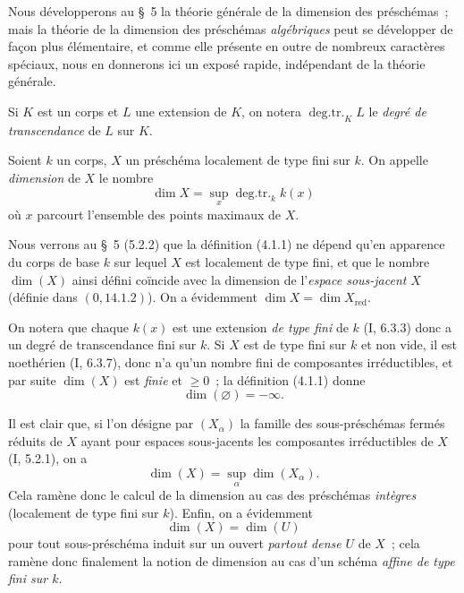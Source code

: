 Nous développerons au \S~5 la théorie générale de la dimension des préschémas~;
mais la théorie de la dimension des préschémas \emph{algébriques} peut se
développer de façon plus élémentaire, et comme elle présente en outre de
nombreux caractères spéciaux, nous en donnerons ici un exposé rapide,
indépendant de la théorie générale.

Si $K$ est un corps et $L$ une extension de $K$, on notera
$\operatorname{deg.tr.}_K L$ le \emph{degré de transcendance} de $L$ sur $K$.

\begin{definition}[4.1.1]
\label{IV.2.4.1.1-fr}
Soient $k$ un corps, $X$ un préschéma localement de type fini sur $k$. On
appelle \emph{dimension} de $X$ le nombre
\begin{equation}
\tag{4.1.1.1}
\label{IV.2.4.1.1.1-fr}
\dim X=\sup_x\operatorname{deg.tr.}_k k(x)
\end{equation}
où $x$ parcourt l'ensemble des points maximaux de $X$.
\end{definition}

Nous verrons au \S~5 (5.2.2) que la définition (4.1.1) ne dépend qu'en
apparence du corps de base $k$ sur lequel $X$ est localement de type fini, et
que le nombre $\dim(X)$ ainsi défini coïncide avec la dimension de
l'\emph{espace sous-jacent} $X$ (définie dans $(0,14.1.2)$). On a évidemment
$\dim X=\dim X_{\mathrm{red}}$.

On notera que chaque $k(x)$ est une extension \emph{de type fini} de $k$
(I, 6.3.3) donc a un degré de transcendance fini sur $k$. Si $X$ est de type
fini sur $k$ et non vide, il est noethérien (I, 6.3.7), donc n'a qu'un nombre
fini de composantes irréductibles, et par suite $\dim(X)$ est \emph{finie} et
$\geqslant0$~; la définition (4.1.1) donne
\[
\dim(\varnothing)=-\infty.
\]

Il est clair que, si l'on désigne par $(X_\alpha)$ la famille des
sous-préschémas fermés réduits de $X$ ayant pour espaces sous-jacents les
composantes irréductibles de $X$ (I, 5.2.1), on a
\begin{equation}
\tag{4.1.1.2}
\label{IV.2.4.1.1.2-fr}
\dim(X)=\sup_\alpha\dim(X_\alpha).
\end{equation}
Cela ramène donc le calcul de la dimension au cas des préschémas \emph{intègres}
(localement de type fini sur $k$). Enfin, on a évidemment
\begin{equation}
\tag{4.1.1.3}
\label{IV.2.4.1.1.3-fr}
\dim(X)=\dim(U)
\end{equation}
pour tout sous-préschéma induit sur un ouvert \emph{partout dense} $U$ de
$X$~; cela ramène donc finalement la notion de dimension au cas d'un schéma
\emph{affine de type fini sur $k$}.

